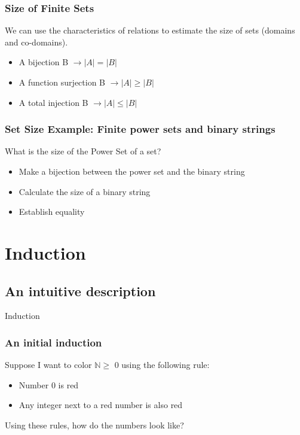\documentclass{beamer}
\begin{document}
\begin{frame}
  \frametitle{Size of Finite Sets}

  {\larger
    We can use the characteristics of relations to estimate the
    size of sets (domains and co-domains).

    \vfill

    \begin{itemize}
    \item A bijection B $\rightarrow |A| = |B|$
    \item A function surjection B $\rightarrow |A| \geq |B|$
    \item A total injection B $\rightarrow |A| \leq |B|$
    \end{itemize}
  }
\end{frame}

\begin{frame}
  \frametitle{Set Size Example: Finite power sets and binary strings}

  {\larger
    What is the size of the Power Set of a  set?

    \vfill

    \begin{itemize}
    \item Make a bijection between the power set and the binary string
    \item Calculate the size of a binary string
    \item Establish equality
    \end{itemize}
    
  }
\end{frame}


\section{Induction}
\subsection{An intuitive description}
\begin{frame}
  \begin{center}
  {\huge Induction }
  \end{center}
\end{frame}

\begin{frame}
  \frametitle{An initial induction}
  {\larger
    Suppose I want to color $\mathbb{N} \geq$ 0 using the following rule:

    \bigskip
    
    \begin{itemize}
    \item Number $0$ is \alert{red}
    \item Any integer next to a \alert{red} number is also \alert{red}
    \end{itemize}

    \bigskip

    Using these rules, how do the numbers look like?
  }  
\end{frame}
\end{document}
